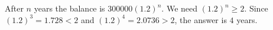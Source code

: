 After $n$ years the balance is $300000(1.2)^n$. We need $(1.2)^n\ge2$. Since $(1.2)^3=1.728<2$ and $(1.2)^4=2.0736>2$, the answer is $\boxed4$ years.
